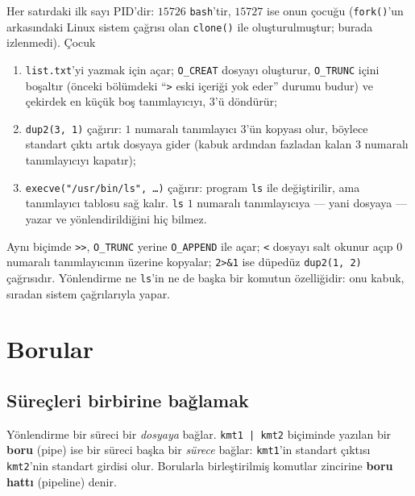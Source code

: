 \documentclass[11pt,a4paper]{article}
\newcommand{\term}[1]{\textbf{\color{mintdeep}#1}}
\newcommand{\cmd}[1]{\texttt{#1}}
\begin{document}


Her satırdaki ilk sayı PID'dir: $15726$ \cmd{bash}'tir, $15727$ ise onun çocuğu (\cmd{fork()}'un arkasındaki Linux sistem çağrısı olan \cmd{clone()} ile oluşturulmuştur; burada izlenmedi). Çocuk
\begin{enumerate}[leftmargin=1.4em]
  \item \texttt{list.txt}'yi yazmak için açar; \texttt{O\_CREAT} dosyayı oluşturur, \texttt{O\_TRUNC} içini boşaltır (önceki bölümdeki ``\cmd{>} eski içeriği yok eder'' durumu budur) ve çekirdek en küçük boş tanımlayıcıyı, $3$'ü döndürür;
  \item \cmd{dup2(3, 1)} çağırır: $1$ numaralı tanımlayıcı $3$'ün kopyası olur, böylece standart çıktı artık dosyaya gider (kabuk ardından fazladan kalan $3$ numaralı tanımlayıcıyı kapatır);
  \item \cmd{execve("/usr/bin/ls", \dots)} çağırır: program \cmd{ls} ile değiştirilir, ama tanımlayıcı tablosu sağ kalır. \cmd{ls} $1$ numaralı tanımlayıcıya --- yani dosyaya --- yazar ve yönlendirildiğini hiç bilmez.
\end{enumerate}
Aynı biçimde \cmd{>>}, \texttt{O\_TRUNC} yerine \texttt{O\_APPEND} ile açar; \cmd{<} dosyayı salt okunur açıp $0$ numaralı tanımlayıcının üzerine kopyalar; \cmd{2>\&1} ise düpedüz \cmd{dup2(1, 2)} çağrısıdır. Yönlendirme ne \cmd{ls}'in ne de başka bir komutun özelliğidir: onu kabuk, sıradan sistem çağrılarıyla yapar.

\section{Borular}
\label{sec:pipes}

\subsection{Süreçleri birbirine bağlamak}

Yönlendirme bir süreci bir \emph{dosyaya} bağlar. \cmd{kmt1 | kmt2} biçiminde yazılan bir \term{boru} (pipe) ise bir süreci başka bir \emph{sürece} bağlar: \cmd{kmt1}'in standart çıktısı \cmd{kmt2}'nin standart girdisi olur. Borularla birleştirilmiş komutlar zincirine \term{boru hattı} (pipeline) denir.
\end{document}
